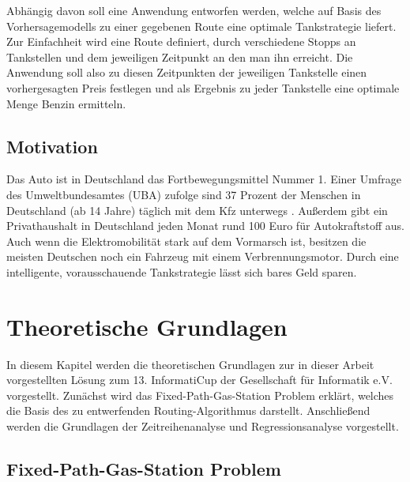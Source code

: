 \documentclass[
ngerman          %
,a4paper          %
,11pt
,pdftex
]{report}
\begin{document}
Abhängig davon soll eine Anwendung entworfen werden, welche auf Basis des Vorhersagemodells zu einer gegebenen Route eine optimale Tankstrategie liefert.
Zur Einfachheit wird eine Route definiert, durch verschiedene Stopps an Tankstellen und dem jeweiligen Zeitpunkt an den man ihn erreicht. Die Anwendung soll also zu diesen Zeitpunkten der jeweiligen Tankstelle einen vorhergesagten Preis festlegen und als Ergebnis zu jeder Tankstelle eine optimale Menge Benzin ermitteln.

\section{Motivation}
Das Auto ist in Deutschland das Fortbewegungsmittel Nummer 1. Einer Umfrage des Umweltbundesamtes (UBA) zufolge sind 37 Prozent der Menschen in Deutschland (ab 14 Jahre) täglich mit dem Kfz unterwegs \cite{fortbewegung}. Außerdem gibt ein Privathaushalt in Deutschland jeden Monat rund 100 Euro für Autokraftstoff aus. Auch wenn die Elektromobilität stark auf dem Vormarsch ist, besitzen die meisten Deutschen noch ein Fahrzeug mit einem Verbrennungsmotor. Durch eine intelligente, vorausschauende Tankstrategie lässt sich bares Geld sparen. 


\chapter{Theoretische Grundlagen}

In diesem Kapitel werden die theoretischen Grundlagen zur in dieser Arbeit vorgestellten Lösung zum 13. InformatiCup der Gesellschaft für Informatik e.V. vorgestellt. Zunächst wird das Fixed-Path-Gas-Station Problem erklärt, welches die Basis des zu entwerfenden Routing-Algorithmus darstellt. Anschließend werden die Grundlagen der Zeitreihenanalyse und Regressionsanalyse vorgestellt.

\section{Fixed-Path-Gas-Station Problem}
\end{document}
